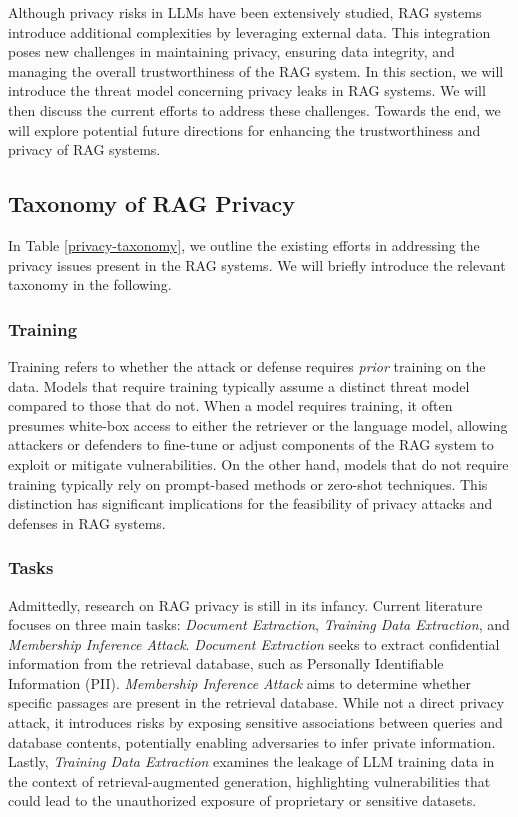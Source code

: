 

Although privacy risks in LLMs have been extensively studied, RAG systems introduce additional complexities by leveraging external data. This integration poses new challenges in maintaining privacy, ensuring data integrity, and managing the overall trustworthiness of the RAG system. In this section, we will introduce the threat model concerning privacy leaks in RAG systems. We will then discuss the current efforts to address these challenges. Towards the end, we will explore potential future directions for enhancing the trustworthiness and privacy of RAG systems. 

\subsection{Taxonomy of RAG Privacy}
In Table \ref{privacy-taxonomy}, we outline the existing efforts in addressing the privacy issues present in the RAG systems. We will briefly introduce the relevant taxonomy in the following. 

\subsubsection{Training}
Training refers to whether the attack or defense requires \textit{prior} training on the data. Models that require training typically assume a distinct threat model compared to those that do not. When a model requires training, it often presumes white-box access to either the retriever or the language model, allowing attackers or defenders to fine-tune or adjust components of the RAG system to exploit or mitigate vulnerabilities. On the other hand, models that do not require training typically rely on prompt-based methods or zero-shot techniques. This distinction has significant implications for the feasibility of privacy attacks and defenses in RAG systems.

\subsubsection{Tasks} Admittedly, research on RAG privacy is still in its infancy. Current literature focuses on three main tasks: \textit{Document Extraction}, \textit{Training Data Extraction}, and \textit{Membership Inference Attack}. \textit{Document Extraction} seeks to extract confidential information from the retrieval database, such as Personally Identifiable Information (PII). \textit{Membership Inference Attack} aims to determine whether specific passages are present in the retrieval database. While not a direct privacy attack, it introduces risks by exposing sensitive associations between queries and database contents, potentially enabling adversaries to infer private information. Lastly, \textit{Training Data Extraction} examines the leakage of LLM training data in the context of retrieval-augmented generation, highlighting vulnerabilities that could lead to the unauthorized exposure of proprietary or sensitive datasets.

